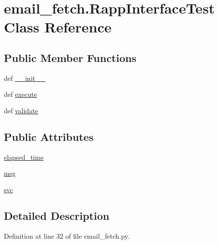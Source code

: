 \hypertarget{classemail__fetch_1_1RappInterfaceTest}{\section{email\-\_\-fetch.\-Rapp\-Interface\-Test Class Reference}
\label{classemail__fetch_1_1RappInterfaceTest}
}
\subsection*{Public Member Functions}
\begin{DoxyCompactItemize}
\item 
def \hyperlink{classemail__fetch_1_1RappInterfaceTest_ae7444019422252f976130418c1d05c2a}{\-\_\-\-\_\-init\-\_\-\-\_\-}
\item 
def \hyperlink{classemail__fetch_1_1RappInterfaceTest_a2734788abe50238194f49c133fa7a5d5}{execute}
\item 
def \hyperlink{classemail__fetch_1_1RappInterfaceTest_a740c390fced690da30326205011b360a}{validate}
\end{DoxyCompactItemize}
\subsection*{Public Attributes}
\begin{DoxyCompactItemize}
\item 
\hyperlink{classemail__fetch_1_1RappInterfaceTest_a40dba1e6da2ce6b43eb17e15c6d5afb6}{elapsed\-\_\-time}
\item 
\hyperlink{classemail__fetch_1_1RappInterfaceTest_aee802a3eecdf0be3985f45ecc37821af}{msg}
\item 
\hyperlink{classemail__fetch_1_1RappInterfaceTest_ac7e19278efc30da520c1390d6a4dda92}{svc}
\end{DoxyCompactItemize}


\subsection{Detailed Description}


Definition at line 32 of file email\-\_\-fetch.\-py.




